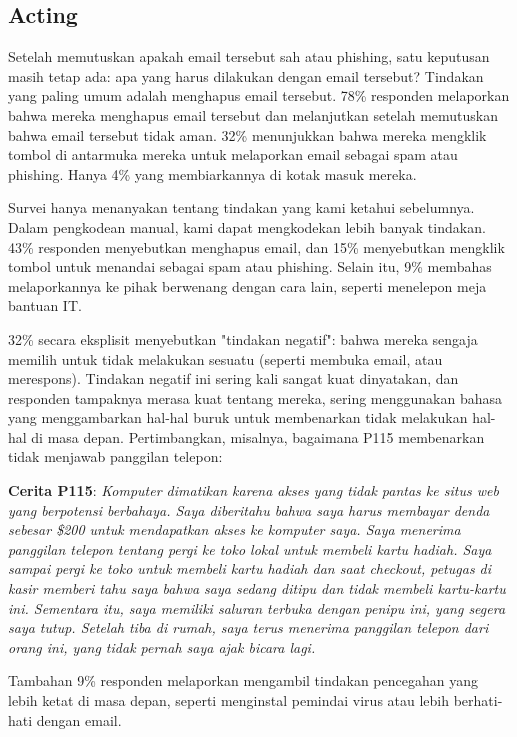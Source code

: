 \documentclass[lettersize,journal]{IEEEtran}
\begin{document}
\subsection{Acting}

Setelah memutuskan apakah email tersebut sah atau phishing, satu keputusan
masih tetap ada: apa yang harus dilakukan dengan email tersebut? Tindakan yang
paling umum adalah menghapus email tersebut. 78\% responden melaporkan bahwa
mereka menghapus email tersebut dan melanjutkan setelah memutuskan bahwa email
tersebut tidak aman. 32\% menunjukkan bahwa mereka mengklik tombol di antarmuka
mereka untuk melaporkan email sebagai spam atau phishing. Hanya 4\% yang
membiarkannya di kotak masuk mereka.

Survei hanya menanyakan tentang tindakan yang kami ketahui sebelumnya. Dalam
pengkodean manual, kami dapat mengkodekan lebih banyak tindakan. 43\% responden
menyebutkan menghapus email, dan 15\% menyebutkan mengklik tombol untuk
menandai sebagai spam atau phishing. Selain itu, 9\% membahas melaporkannya ke
pihak berwenang dengan cara lain, seperti menelepon meja bantuan IT.

32\% secara eksplisit menyebutkan "tindakan negatif": bahwa mereka
sengaja memilih untuk tidak melakukan sesuatu (seperti membuka email,
atau merespons). Tindakan negatif ini sering kali sangat kuat
dinyatakan, dan responden tampaknya merasa kuat tentang mereka,
sering menggunakan bahasa yang menggambarkan hal-hal buruk untuk membenarkan tidak melakukan
hal-hal di masa depan. Pertimbangkan, misalnya, bagaimana P115 membenarkan
tidak menjawab panggilan telepon:

\textbf{Cerita P115}: \textit{Komputer dimatikan karena akses yang tidak pantas ke situs web yang berpotensi berbahaya. Saya diberitahu bahwa saya harus membayar denda sebesar \$200 untuk mendapatkan akses ke komputer saya. Saya menerima panggilan telepon tentang pergi ke toko lokal untuk membeli kartu hadiah. Saya sampai pergi ke toko untuk membeli kartu hadiah dan saat checkout, petugas di kasir memberi tahu saya bahwa saya sedang ditipu dan tidak membeli kartu-kartu ini. Sementara itu, saya memiliki saluran terbuka dengan penipu ini, yang segera saya tutup. Setelah tiba di rumah, saya terus menerima panggilan telepon dari orang ini, yang tidak pernah saya ajak bicara lagi.}

Tambahan 9\% responden melaporkan mengambil tindakan pencegahan yang lebih
ketat di masa depan, seperti menginstal pemindai virus atau lebih berhati-hati
dengan email.
\end{document}
